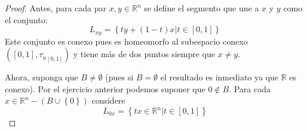 \documentclass[12pt]{report}
\theoremstyle{largebreak}
\begin{document}
    \begin{proof}
        Antes, para cada par $x,y\in\mathbb{R}^n$ se define el segmento que une a $x$ y $y$ como el conjunto:
        \begin{equation*}
            L_{ xy}=\left\{ty+(1-t)x\Big|t\in[0,1] \right\}
        \end{equation*}
        Este conjunto es conexo pues es homeomorfo al subespacio conexo $([0,1],{\tau_u}_{[0,1]})$ y tiene más de dos puntos siempre que $x\neq y$.

        Ahora, suponga que $B\neq\emptyset$ (pues si $B=\emptyset$ el resultado es inmediato ya que $\mathbb{R}$ es conexo). Por el ejercicio anterior podemos suponer que $0\notin B$. Para cada $x\in\mathbb{R}^n-(B\cup\left\{0\right\})$ considere
        \begin{equation*}
            L_{0x}=\left\{tx\in\mathbb{R}^n \Big|t\in[0,1]\right\}
        \end{equation*} 
        

\end{proof}
\end{document}

